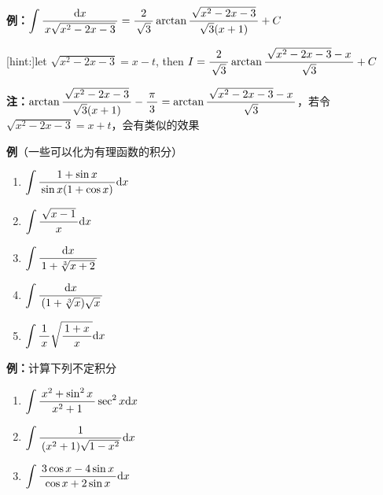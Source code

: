 {\bf 例：}$\dint\df{\d x}{x\sqrt{x^2-2x-3}}=\df2{\sqrt3}
\arctan\df{\sqrt{x^2-2x-3}}{\sqrt3(x+1)}+C$

[hint:]let $\sqrt{x^2-2x-3}=x-t$, then $I=\df2{\sqrt3}\arctan
\df{\sqrt{x^2-2x-3}-x}{\sqrt3}+C$

{\bf 注：}$\arctan\df{\sqrt{x^2-2x-3}}{\sqrt3(x+1)}-\df{\pi}3=\arctan
\df{\sqrt{x^2-2x-3}-x}{\sqrt3}$，若令$\sqrt{x^2-2x-3}=x+t$，会有类似的效果

{\bf 例}（一些可以化为有理函数的积分）
\begin{enumerate}[(1)]
  \setlength{\itemindent}{1cm}
  \item $\dint\df{1+\sin x}{\sin x(1+\cos x)}\d x$ 
  \item $\dint\df{\sqrt{x-1}}{x}\d x$ 
  \item $\dint\df{\d x}{1+\sqrt[3]{x+2}}$ 
  \item $\dint\df{\d x}{(1+\sqrt[3]{x})\sqrt x}$ 
  \item $\dint\df 1x\sqrt{\df{1+x}{x}}\d x$
\end{enumerate}

{\bf 例：}计算下列不定积分
\begin{enumerate}[(1)]
  \setlength{\itemindent}{1cm}
  \item $\dint\df{x^2+\sin^2x}{x^2+1}\sec^2x\d x$
  \item $\dint\df 1{(x^2+1)\sqrt{1-x^2}}\d x$
  \item $\dint\df{3\cos x-4\sin x}{\cos x+2\sin x}\d x$
\end{enumerate}

